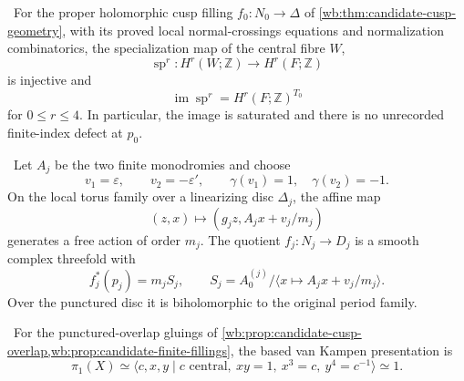 \begin{theorem}
\label{mapsI:top:thm:p0-integral-specialization}
\ For the proper holomorphic cusp filling
\(f_0:N_0\to\Delta\) of \cref{wb:thm:candidate-cusp-geometry}, with its
proved local normal-crossings equations and normalization combinatorics,
the specialization map of the central fibre \(W\),
\[
 \operatorname{sp}^r:H^r(W;\mathbb Z)\longrightarrow H^r(F;\mathbb Z)
\]
is injective and
\[
 \operatorname{im}\operatorname{sp}^r
 =H^r(F;\mathbb Z)^{T_0}
\tag{IL.5.1}
\]
for \(0\le r\le4\).  In particular, the image is saturated and there is no
unrecorded finite-index defect at \(p_0\).
\end{theorem}

\begin{proposition}
\label{wb:prop:candidate-finite-fillings}
\ Let \(A_j\) be the two finite monodromies and choose
\[
 v_1=\varepsilon,\qquad v_2=-\varepsilon',
 \qquad \gamma(v_1)=1,\quad\gamma(v_2)=-1.
\]
On the local torus family over a linearizing disc \(\Delta_j\), the affine
map
\[
 (z,x)\longmapsto(g_jz,A_jx+v_j/m_j)
\tag{2.9}
\]
generates a free action of order \(m_j\).  The quotient
\(f_j:N_j\to D_j\) is a smooth complex threefold with
\[
 f_j^*(p_j)=m_jS_j,\qquad
 S_j=A_0^{(j)}/\langle x\mapsto A_jx+v_j/m_j\rangle.
\tag{2.10}
\]
Over the punctured disc it is biholomorphic to the original period family.
\end{proposition}

\begin{proposition}
\label{mapsI:top:prop:geometric-pi1}
\ For the punctured-overlap gluings of
\cref{wb:prop:candidate-cusp-overlap,wb:prop:candidate-finite-fillings}, the based
van Kampen presentation is
\[
 \pi_1(X)\simeq
 \langle c,x,y\mid c\text{ central},\ xy=1,\ x^3=c,\ y^4=c^{-1}\rangle
 \simeq1.
\tag{IL.5.24}
\]
\end{proposition}

